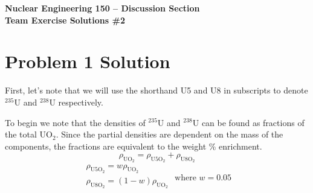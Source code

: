 \documentclass{report}
\newif\ifeqns
\begin{document}
\begin{center}
\textbf{\large Nuclear Engineering 150 -- Discussion Section}\\ 
\textbf{Team Exercise Solutions \#2}
\end{center}



\section*{Problem 1 Solution}


\ifeqns
First, let's note that we will use the shorthand U5 and U8 in subscripts to denote $^{235}$U and $^{238}$U respectively. 

To begin we note that the densities of $^{235}$U and $^{238}$U can be found as fractions of the total UO$_2$. Since the partial densities are dependent on the mass of the components, the fractions are equivalent to the weight \% enrichment.
$$ \rho_{\text{UO}_2} = \rho_{\text{U5O}_2} + \rho_{\text{U8O}_2}$$
$$ \begin{array}{lr}
        \rho_{\text{U5O}_2} = w\rho_{\text{UO}_2}    \\
        \rho_{\text{U8O}_2} = (1-w)\rho_{\text{UO}_2}\\
        \end{array} \text{ where } w = 0.05 $$
        
\end{document}
